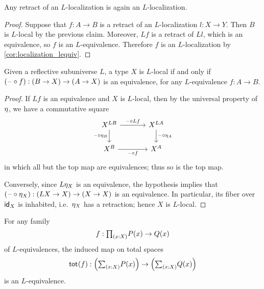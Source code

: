 \begin{cor}\label{cor:localization_retract}
Any retract of an $L$-localization is again an $L$-localization.
\end{cor}

\begin{proof}
Suppose that $f:A\to B$ is a retract of an $L$-localization $l:X\to Y$. Then $B$ is $L$-local by the previous claim.
Moreover, $Lf$ is a retract of $Ll$, which is an equivalence, so $f$ is an $L$-equivalence. Therefore $f$ is an $L$-localization by \cref{cor:localization_lequiv}.
\end{proof}

\begin{prp}\label{thm:rsu-galois}
  Given a reflective subuniverse $L$, a type $X$ is $L$-local if and only if $(\blank \circ f) : (B\to X) \to (A\to X)$ is an equivalence, for any $L$-equivalence $f:A\to B$.
\end{prp}

\begin{proof}
  If $L f$ is an equivalence and $X$ is $L$-local, then by the universal property of $\modalunit$, we have a commutative square
  \[
  \begin{tikzcd}[column sep=large]
    X^{LB} \ar[r,"\blank\circ Lf"] & X^{LA} \\
    X^{B} \ar[r,"\blank\circ f"'] \ar[from=u,"{\blank\circ \modalunit[B]}"'] &
    X^{A} \ar[from=u,"{\blank\circ \modalunit[A]}"]
  \end{tikzcd}
  \]
  in which all but the top map are equivalences; thus so is the top map.

  Conversely, since $L\modalunit[X]$ is an equivalence, the hypothesis implies that
  $(\blank \circ \modalunit[X]) : (L X\to X) \to (X\to X)$
  is an equivalence.
  In particular, its fiber over $\idfunc[X]$ is inhabited, i.e.\ $\modalunit[X]$ has a retraction; hence $X$ is $L$-local.
\end{proof}

\begin{prp}\label{lem:Lequiv_total}
For any family
\begin{equation*}
f:\prd{x:X}P(x)\to Q(x)
\end{equation*}
of $L$-equivalences, the induced map on total spaces
\begin{equation*}
\total{f}:\Big(\sm{x:X}P(x)\Big)\to \Big(\sm{x:X} Q(x)\Big)
\end{equation*}
is an $L$-equivalence.
\end{prp}

